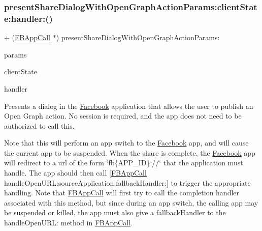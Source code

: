 \subsubsection{\texorpdfstring{present\+Share\+Dialog\+With\+Open\+Graph\+Action\+Params\+:client\+State\+:handler\+:()}{presentShareDialogWithOpenGraphActionParams:clientState:handler:()}\hspace{0.1cm}{\footnotesize\ttfamily [2/5]}}
{\footnotesize\ttfamily + (\hyperlink{interfaceFBAppCall}{F\+B\+App\+Call} $\ast$) present\+Share\+Dialog\+With\+Open\+Graph\+Action\+Params\+: \begin{DoxyParamCaption}\item[{(\hyperlink{interfaceFBOpenGraphActionParams}{F\+B\+Open\+Graph\+Action\+Params} $\ast$)}]{params }\item[{clientState:(N\+S\+Dictionary $\ast$)}]{client\+State }\item[{handler:(F\+B\+Dialog\+App\+Call\+Completion\+Handler)}]{handler }\end{DoxyParamCaption}}

Presents a dialog in the \hyperlink{interfaceFacebook}{Facebook} application that allows the user to publish an Open Graph action. No session is required, and the app does not need to be authorized to call this.

Note that this will perform an app switch to the \hyperlink{interfaceFacebook}{Facebook} app, and will cause the current app to be suspended. When the share is complete, the \hyperlink{interfaceFacebook}{Facebook} app will redirect to a url of the form \char`\"{}fb\{\+A\+P\+P\+\_\+\+I\+D\}\+://\char`\"{} that the application must handle. The app should then call \mbox{[}\hyperlink{interfaceFBAppCall}{F\+B\+App\+Call} handle\+Open\+U\+R\+L\+:source\+Application\+:fallback\+Handler\+:\mbox{]} to trigger the appropriate handling. Note that \hyperlink{interfaceFBAppCall}{F\+B\+App\+Call} will first try to call the completion handler associated with this method, but since during an app switch, the calling app may be suspended or killed, the app must also give a fallback\+Handler to the handle\+Open\+U\+RL\+: method in \hyperlink{interfaceFBAppCall}{F\+B\+App\+Call}.


